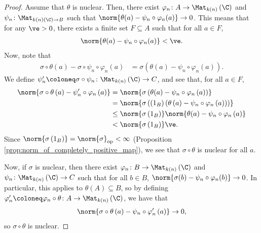 \begin{proof}
  Assume that $\theta$ is nuclear. Then, there exist $\varphi_n\colon A\rightarrow \Mat_{k(n)}\left( \C \right)$ and $\psi_n\colon \Mat_{k(n)\left( \C \right)\rightarrow B}$ such that $\norm{\theta(a) - \psi_n\circ\varphi_n(a)} \rightarrow 0$. This means that for any $\ve > 0$, there exists a finite set $F\subseteq A$ such that for all $a\in F$,
  \begin{align*}
    \norm{\theta(a) - \psi_n\circ\varphi_n(a)} < \ve.
  \end{align*}
  Now, note that
  \begin{align*}
    \sigma\circ\theta(a) - \sigma\circ\psi_n\circ\varphi_n(a) &= \sigma\left( \theta(a) - \psi_n\circ \varphi_n(a) \right).
  \end{align*}
  We define $\psi_n' \coloneq \sigma\circ \psi_n\colon \Mat_{k(n)}\left( \C \right)\rightarrow C$, and see that, for all $a\in F$,
  \begin{align*}
    \norm{\sigma\circ\theta\left( a \right) - \psi_n'\circ\varphi_n\left( a \right)} &= \norm{\sigma\left( \theta(a) - \psi_n\circ\varphi_n\left( a \right) \right)}\\
                                                                                     &= \norm{\sigma\left( \left( 1_B \right)\left( \theta\left( a \right) - \psi_n\circ\varphi_n\left( a \right) \right) \right)}\\
                                                                                     &\leq \norm{\sigma\left(1_B\right)}\norm{\theta(a) - \psi_n\circ\varphi_n\left( a \right)}\\
                                                                                     &< \norm{\sigma\left(1_B\right)} \ve.
  \end{align*}
  Since $\norm{\sigma\left( 1_B \right)} = \norm{\sigma}_{\op} < \infty$ (Proposition \ref{prop:norm_of_completely_positive_map}), we see that $\sigma\circ\theta$ is nuclear for all $a$.\newline

  Now, if $\sigma$ is nuclear, then there exist $\varphi_n\colon B\rightarrow \Mat_{k(n)}\left( \C \right)$ and $\psi_n\colon \Mat_{k(n)}\left( \C \right)\rightarrow C$ such that for all $b\in B$, $\norm{\sigma(b) - \psi_n\circ\varphi_n(b)} \rightarrow 0$. In particular, this applies to $\theta(A)\subseteq B$, so by defining $\varphi_n' \coloneq \varphi_n\circ\theta\colon A \rightarrow \Mat_{k(n)}\left( \C \right)$, we have that
  \begin{align*}
    \norm{\sigma\circ\theta\left( a \right) - \psi_n\circ\varphi_n'\left( a \right)}\rightarrow 0,
  \end{align*}
  so $\sigma\circ\theta$ is nuclear.
\end{proof}
